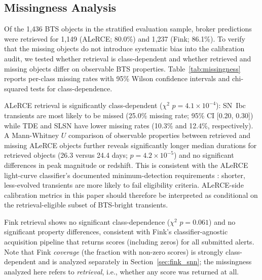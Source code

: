 \documentclass[twocolumn]{aastex631}
\begin{document}
\subsection{Missingness Analysis}
\label{sec:missingness}

Of the 1{,}436 BTS objects in the stratified evaluation sample, broker
predictions were retrieved for 1{,}149 (ALeRCE; 80.0\%) and 1{,}237
(Fink; 86.1\%). To verify that the missing objects do not introduce
systematic bias into the calibration audit, we tested whether retrieval
is class-dependent and whether retrieved and missing objects differ on
observable BTS properties. Table~\ref{tab:missingness} reports per-class
missing rates with 95\% Wilson confidence intervals and chi-squared tests
for class-dependence.

ALeRCE retrieval is significantly class-dependent ($\chi^2$
$p = 4.1 \times 10^{-4}$): SN~Ibc transients are most likely to be missed
(25.0\% missing rate; 95\% CI [0.20, 0.30]) while
TDE and SLSN have lower missing rates (10.3\% and 12.4\%, respectively).
A Mann-Whitney $U$ comparison of observable properties between retrieved
and missing ALeRCE objects further reveals significantly longer median
durations for retrieved objects (26.3 versus 24.4 days;
$p = 4.2 \times 10^{-5}$) and no significant differences in peak magnitude
or redshift. This is consistent with the ALeRCE light-curve classifier's
documented minimum-detection requirements \citep{sanchezsaez2021}: shorter,
less-evolved transients are more likely to fail eligibility criteria.
ALeRCE-side calibration metrics in this paper should therefore be
interpreted as conditional on the retrieval-eligible subset of BTS-bright
transients.

Fink retrieval shows no significant class-dependence ($\chi^2$ $p = 0.061$)
and no significant property differences, consistent with Fink's
classifier-agnostic acquisition pipeline that returns scores (including
zeros) for all submitted alerts. Note that Fink \emph{coverage} (the
fraction with non-zero scores) is strongly class-dependent and is
analyzed separately in Section~\ref{sec:fink_snn}; the missingness
analyzed here refers to \emph{retrieval}, i.e., whether any score was
returned at all.
\end{document}
